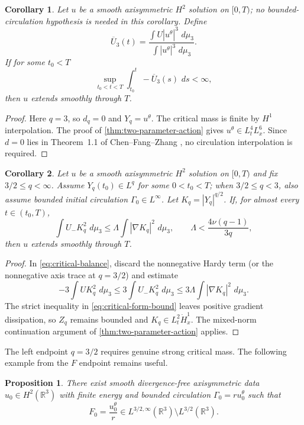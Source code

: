\documentclass[11pt]{article}
\numberwithin{equation}{section}
\newtheorem{proposition}[proposition]{Proposition}
\newtheorem{corollary}[corollary]{Corollary}
\theoremstyle{definition}
\newcommand{\R}{\mathbb R}
\newcommand{\dd}{\,d}
\begin{document}
\begin{corollary}\label{cor:q3-universal}
Let $u$ be a smooth axisymmetric $H^2$ solution on $[0,T)$; no bounded-circulation hypothesis is needed in this corollary.  Define
\[
 \overline U_3(t)
 =\frac{\int U|u^\theta|^3\,\dd\mu_3}{\int|u^\theta|^3\,\dd\mu_3}.
\]
If for some $t_0<T$
\[
 \sup_{t_0<t<T}\int_{t_0}^t-\overline U_3(s)\,\dd s<\infty,
\]
then $u$ extends smoothly through $T$.
\end{corollary}

\begin{proof}
Here $q=3$, so $d_q=0$ and $Y_q=u^\theta$.  The critical mass is finite by $H^1$ interpolation.  The proof of \cref{thm:two-parameter-action} gives
$u^\theta\in L_t^4L_x^6$.  Since $d=0$ lies in Theorem~1.1 of Chen--Fang--Zhang \cite{ChenFangZhang2017}, no circulation interpolation is required.
\end{proof}

\begin{corollary}\label{cor:critical-form-bound}
Let $u$ be a smooth axisymmetric $H^2$ solution on $[0,T)$ and fix $3/2\le q<\infty$.  Assume $Y_q(t_0)\in L^q$ for some $0<t_0<T$; when $3/2\le q<3$, also assume bounded initial circulation $\Gamma_0\in L^\infty$.  Let $K_q=|Y_q|^{q/2}$.  If, for almost every $t\in(t_0,T)$,
\begin{equation}\label{eq:critical-form-bound}
 \int U_-K_q^2\,\dd\mu_3
 \le\Lambda\int|\nabla K_q|^2\,\dd\mu_3,
 \qquad
 \Lambda<\frac{4\nu(q-1)}{3q},
\end{equation}
then $u$ extends smoothly through $T$.
\end{corollary}

\begin{proof}
In \eqref{eq:critical-balance}, discard the nonnegative Hardy term (or the nonnegative axis trace at $q=3/2$) and estimate
\[
 -3\int U K_q^2\,\dd\mu_3
 \le3\int U_-K_q^2\,\dd\mu_3
 \le3\Lambda\int|\nabla K_q|^2\,\dd\mu_3.
\]
The strict inequality in \eqref{eq:critical-form-bound} leaves positive gradient dissipation, so $Z_q$ remains bounded and $K_q\in L_t^2\dot H_x^1$.  The mixed-norm continuation argument of \cref{thm:two-parameter-action} applies.
\end{proof}

The left endpoint $q=3/2$ requires genuine strong critical mass.  The following example from the $F$ endpoint remains useful.

\begin{proposition}\label{prop:weak-endpoint}
There exist smooth divergence-free axisymmetric data $u_0\in H^2(\R^3)$ with finite energy and bounded circulation $\Gamma_0=ru_0^\theta$ such that
\[
 F_0=\frac{u_0^\theta}{r}
 \in L^{3/2,\infty}(\R^3)\setminus L^{3/2}(\R^3).
\]
\end{proposition}
\end{document}
